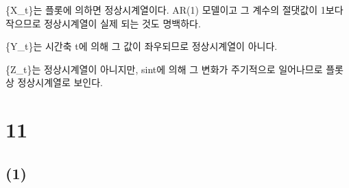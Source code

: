 \documentclass[
]{article}
\begin{document}
\{X\_t\}는 플롯에 의하면 정상시계열이다. AR(1) 모델이고 그 계수의
절댓값이 1보다 작으므로 정상시계열이 실제 되는 것도 명백하다.

\{Y\_t\}는 시간축 t에 의해 그 값이 좌우되므로 정상시계열이 아니다.

\{Z\_t\}는 정상시계열이 아니지만, sint에 의해 그 변화가 주기적으로
일어나므로 플롯상 정상시계열로 보인다.

\section{11}\label{section-1}

\subsection{(1)}\label{section-2}
\end{document}
